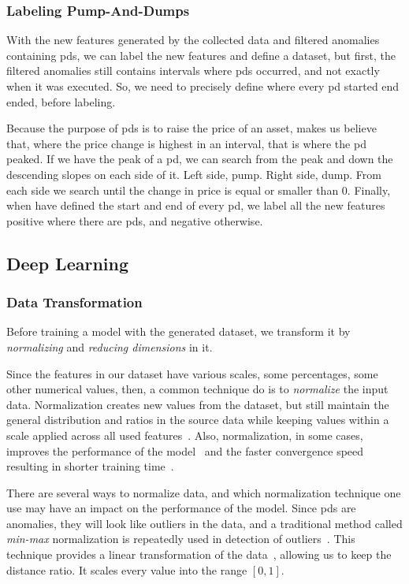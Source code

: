 \subsubsection{Labeling Pump-And-Dumps}
With the new features generated by the collected data and filtered anomalies containing \acp{pd}, we can label the new features and define a dataset, but first, the filtered anomalies still contains intervals where \acp{pd} occurred, and not exactly when it was executed. So, we need to precisely define where every \ac{pd} started end ended, before labeling.

Because the purpose of \acp{pd} is to raise the price of an asset, makes us believe that, where the price change is highest in an interval, that is where the \ac{pd} peaked. If we have the peak of a \ac{pd}, we can search from the peak and down the descending slopes on each side of it. Left side, pump. Right side, dump. From each side we search until the change in price is equal or smaller than $0$. Finally, when have defined the start and end of every \ac{pd}, we label all the new features positive where there are \acp{pd}, and negative otherwise.

\subsection{Deep Learning}
% 

\subsubsection{Data Transformation}
Before training a model with the generated dataset, we transform it by \emph{normalizing} and \emph{reducing dimensions} in it.

Since the features in our dataset have various scales, some percentages, some other numerical values, then, a common technique do is to \emph{normalize} the input data. Normalization creates new values from the dataset, but still maintain the general distribution and ratios in the source data while keeping values within a scale applied across all used features~\cite{normalize_data}. Also, normalization, in some cases, improves the performance of the model~\cite{normalize_google} and the faster convergence speed resulting in shorter training time~\cite{sola1997importance}.

There are several ways to normalize data, and which normalization technique one use may have an impact on the performance of the model. Since \acp{pd} are anomalies, they will look like outliers in the data, and a traditional method called \emph{min-max} normalization is repeatedly used in detection of outliers~\cite{campos2016evaluation, goldstein2016comparative}. This technique provides a linear transformation of the data~\cite{panda2014smoothing}, allowing us to keep the distance ratio. It scales every value into the range $[0,1]$.

